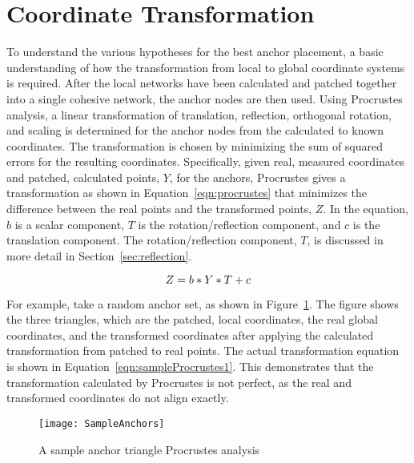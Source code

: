 \section{Coordinate Transformation} \label{sec:procrustes}
To understand the various hypotheses for the best anchor placement, a basic understanding of how the transformation from local to global coordinate systems is required.  After the local networks have been calculated and patched together into a single cohesive network, the anchor nodes are then used. Using Procrustes~\cite{procrustes-matlab} analysis, a linear transformation of translation, reflection, orthogonal rotation, and scaling is determined for the anchor nodes from the calculated to known coordinates. The transformation is chosen by minimizing the sum of squared errors for the resulting coordinates.  Specifically, given real, measured coordinates and patched, calculated points, $Y$, for the anchors, Procrustes gives a transformation as shown in Equation~\ref{eqn:procrustes} that minimizes the difference between the real points and the transformed points, $Z$.  In the equation, $b$ is a scalar component, $T$ is the rotation/reflection component, and $c$ is the translation component.  The rotation/reflection component, $T$, is discussed in more detail in Section~\ref{sec:reflection}.

\begin{equation}\label{eqn:procrustes}
Z = b*Y*T + c \\
\end{equation}

For example, take a random anchor set, as shown in Figure~\ref{fig:sampleProcrustes1}.  The figure shows the three triangles, which are the patched, local coordinates, the real global coordinates, and the transformed coordinates after applying the calculated transformation from patched to real points.  The actual transformation equation is shown in Equation~\ref{eqn:sampleProcrustes1}.  This demonstrates that the transformation calculated by Procrustes is not perfect, as the real and transformed coordinates do not align exactly.

\begin{figure}
	\centering
		\texttt{[image: SampleAnchors]}
	\caption{A sample anchor triangle Procrustes analysis}
	\label{fig:sampleProcrustes1}
\end{figure}

